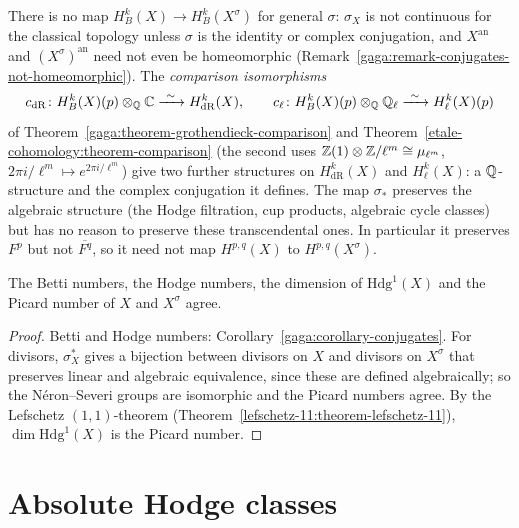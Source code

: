 \begin{remark}\label{absolute-hodge:remark-no-betti}
There is no map $H^k_B(X) \to H^k_B(X^\sigma)$ for general $\sigma$: $\sigma_X$ is not continuous for the classical topology unless $\sigma$ is the identity or complex conjugation, and
$X^{\mathrm{an}}$ and $(X^\sigma)^{\mathrm{an}}$ need not even be homeomorphic (Remark~\ref{gaga:remark-conjugates-not-homeomorphic}). The \emph{comparison isomorphisms}
\[
c_{\mathrm{dR}} \colon H^k_B(X)(p) \otimes_{\mathbb{Q}}\mathbb{C} \xrightarrow{\ \sim\ } H^k_{\mathrm{dR}}(X), \qquad c_\ell \colon H^k_B(X)(p) \otimes_{\mathbb{Q}}\mathbb{Q}_\ell \xrightarrow{\ \sim\ } H^k_\ell(X)(p)
\]
of Theorem~\ref{gaga:theorem-grothendieck-comparison} and Theorem~\ref{etale-cohomology:theorem-comparison} (the second uses $\mathbb{Z}(1) \otimes \mathbb{Z}/\ell^m \cong \mu_{\ell^m}$, $2\pi i/\ell^m \mapsto e^{2\pi i/\ell^m}$) give two
further structures on $H^k_{\mathrm{dR}}(X)$ and $H^k_\ell(X)$: a $\mathbb{Q}$-structure and the complex conjugation it defines. The map $\sigma_*$ preserves the algebraic structure (the Hodge filtration,
cup products, algebraic cycle classes) but has no reason to preserve these transcendental ones. In particular it preserves $F^p$ but not $\overline{F^q}$, so it need not map $H^{p,q}(X)$ to $H^{p,q}(X^\sigma)$.
\end{remark}

\begin{proposition}\label{absolute-hodge:proposition-invariants}
The Betti numbers, the Hodge numbers, the dimension of $\mathrm{Hdg}^1(X)$ and the Picard number of $X$ and $X^\sigma$ agree.
\end{proposition}

\begin{proof}
Betti and Hodge numbers: Corollary~\ref{gaga:corollary-conjugates}. For divisors, $\sigma_X^*$ gives a bijection between divisors on $X$ and divisors on $X^\sigma$ that preserves linear and algebraic
equivalence, since these are defined algebraically; so the N\'eron--Severi groups are isomorphic and the Picard numbers agree. By the Lefschetz $(1,1)$-theorem
(Theorem~\ref{lefschetz-11:theorem-lefschetz-11}), $\dim\mathrm{Hdg}^1(X)$ is the Picard number.
\end{proof}

\section{Absolute Hodge classes}\label{absolute-hodge:section-absolute}

